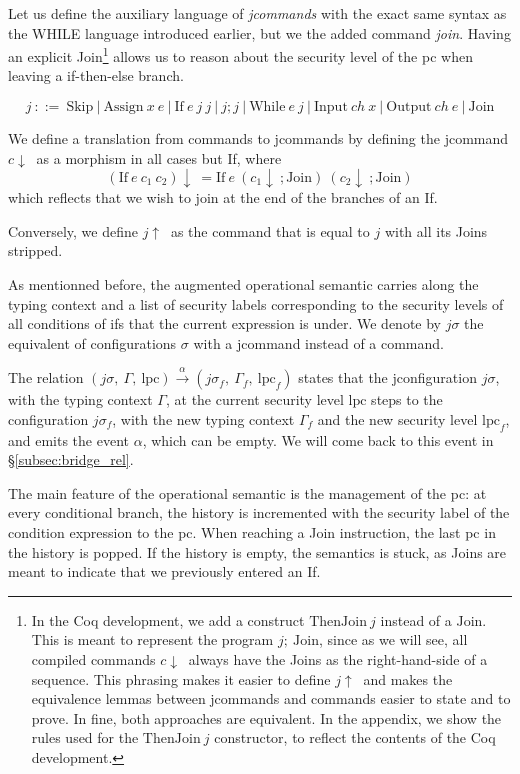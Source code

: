 \documentclass[10pt]{article}
\newcommand{\lpc}{\mathrm{lpc}}
\newcommand{\ctx}{\Gamma}
\newcommand{\conf}{\sigma}
\newcommand{\execaux}[7] { (#1,~#2,~#3) \xrightarrow{#4} (#5,~#6,~#7) }
\newcommand{\compile}[1]{#1\!\downarrow\ }
\newcommand{\uncompile}[1]{#1\!\uparrow\ }
\begin{document}
Let us define the auxiliary language of \emph{jcommands} with the exact same syntax as the WHILE language introduced earlier, but we the added command
\emph{join}. Having an explicit Join\footnote{  In the Coq development, we add a construct \( \mathrm{ThenJoin}\ j \) instead of a \( \mathrm{Join} \). This is meant to represent the program \( j;\ \mathrm{Join} \), since as we will see, all compiled commands \( \compile{c} \) always have the Joins as the right-hand-side of a sequence. This phrasing makes it easier to define \( \uncompile{j} \) and makes the equivalence lemmas between jcommands and commands easier to state and to prove. In fine, both approaches are equivalent. In the appendix, we show the rules used for the \( \mathrm{ThenJoin}\ j \) constructor, to reflect the contents of the Coq development.
} allows us to reason about
the security level of the pc when leaving a if-then-else branch.


\[ \mathit{j}~::=~\mathrm{Skip}\
|\ \mathrm{Assign}~x~e\
|\ \mathrm{If}~e~j~j\
|\ j;j\
|\ \mathrm{While}~e~j\
|\ \mathrm{Input}~ch~x\
|\ \mathrm{Output}~ch~e\ |~\mathrm{Join} \]

We define a translation from commands to jcommands by defining the jcommand \( \compile{c} \) as a morphism in all cases but If, where \[ \compile{(\mathrm{If}~e~c_1~c_2)}=\mathrm{If}~e~(\compile{c_1};\mathrm{Join})~(\compile{c_2};\mathrm{Join}) \] which reflects that we wish to join at the end of the branches of an If.

Conversely, we define \( \uncompile{j} \) as the command that is equal to \( j \) with all its Joins stripped.

As mentionned before, the augmented operational semantic carries along the typing context and a list of security labels corresponding to the security levels of all conditions of ifs that the current expression is under. We denote by \( j\conf \) the equivalent of configurations \( \sigma \) with a jcommand instead of a command.

The relation \(\execaux{j\conf}{\ctx}{\lpc}{\alpha}{j\conf_{f}}{\ctx_{f}}{\lpc_{f}} \)
states that the jconfiguration $j\conf$, with the typing context $\ctx$, at the current security level
$\lpc$ steps to the configuration $j\conf_{f}$, with the new typing context $\ctx_{f}$ and the new
security level $\lpc_{f}$, and emits the event $\alpha$, which can be empty. We will come back to this event in \S\ref{subsec:bridge_rel}.

The main feature of the operational semantic is the management of the pc: at every conditional
branch, the history is incremented with the security label of the condition expression to the pc.
When reaching a Join instruction, the last pc in the history is popped. If the history is empty,
the semantics is stuck, as Joins are meant to indicate that we previously entered an If.
\end{document}
